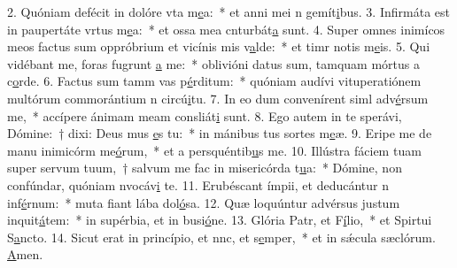 2. Quóniam defécit in dolóre vta m\uline{e}a:~* et anni mei n gemít\uline{i}bus.
3. Infirmáta est in paupertáte vrtus m\uline{e}a:~* et ossa mea cnturbát\uline{a} sunt.
4. Super omnes inimícos meos factus sum oppróbrium et vicínis mis v\uline{a}lde:~* et timr notis m\uline{e}is.
5. Qui vidébant me, foras fugrunt \uline{a} me:~* oblivióni datus sum, tamquam mórtus a c\uline{o}rde.
6. Factus sum tamm vas p\uline{é}rditum:~* quóniam audívi vituperatiónem multórum commorántium n circú\uline{i}tu.
7. In eo dum convenírent siml adv\uline{é}rsum me,~* accípere ánimam meam consliát\uline{i} sunt.
8. Ego autem in te sperávi, Dómine:~† dixi: Deus mus \uline{e}s tu:~* in mánibus tus sortes m\uline{e}æ.
9. Eripe me de manu inimicórm me\uline{ó}rum,~* et a persquéntib\uline{u}s me.
10. Illústra fáciem tuam super servum tuum,~† salvum me fac in misericórda t\uline{u}a:~* Dómine, non confúndar, quóniam nvocáv\uline{i} te.
11. Erubéscant ímpii, et deducántur n inf\uline{é}rnum:~* muta fiant lába dol\uline{ó}sa.
12. Quæ loquúntur advérsus justum inquit\uline{á}tem:~* in supérbia, et in busi\uline{ó}ne.
13. Glória Patr, et F\uline{í}lio,~* et Spirtui S\uline{a}ncto.
14. Sicut erat in princípio, et nnc, et s\uline{e}mper,~* et in sǽcula sæclórum. \uline{A}men.
